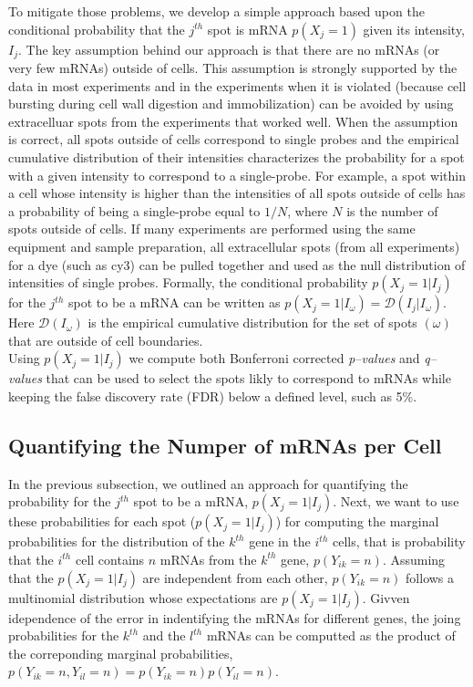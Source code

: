 \documentclass[10pt]{article}
\newcommand{\ith}{\ensuremath{i^{th} }\xspace	}
\newcommand{\jth}{\ensuremath{j^{th} }\xspace	}
\newcommand{\kth}{\ensuremath{k^{th} }\xspace	}
\newcommand{\lth}{\ensuremath{l^{th} }\xspace	}
\begin{document}
\begin{spacing}{1.5}
To mitigate those problems, we develop a simple approach based upon the conditional probability that the $j^{th}$ spot is mRNA $p(X_j=1)$ given its intensity, $I_j$. The key assumption behind our approach is that there are no mRNAs (or very few mRNAs) outside of cells. This assumption is strongly supported by the data in most experiments and in the experiments when it is violated (because cell bursting during cell wall digestion and immobilization) can be avoided by using extracelluar spots from the experiments that worked well. When the assumption is correct, all spots outside of cells correspond to single probes and the empirical cumulative distribution of their intensities characterizes the probability for a spot with a given intensity to correspond to a single-probe. For example, a spot within a cell whose intensity is higher than the intensities of all spots outside of cells has a probability of being a single-probe equal to $1/N$, where $N$ is the number of spots outside of cells. If many experiments are performed using the same equipment and sample preparation, all extracellular spots (from all experiments) for a dye (such as cy3) can be pulled together and used as the null distribution of intensities of single probes. Formally, the conditional probability $p(X_j=1|I_j)$ for  the $j^{th}$ spot to be a mRNA can be written as $p(X_j=1|I_{\omega}) = \mathcal D(I_j|I_{\omega})$. Here $\mathcal D(I_{\omega})$ is the empirical cumulative distribution for the set of spots $(\omega)$ that are outside of cell boundaries. \\

Using $p(X_j=1|I_j)$ we compute both Bonferroni corrected \emph{p--values} and \emph{q--values} that can be used to select the spots likly to correspond to mRNAs while keeping the false discovery rate (FDR) below a defined level, such as 5\%.   


\subsection*{Quantifying the Numper of mRNAs per Cell}
In the previous subsection, we outlined an approach for quantifying the probability for the \jth spot to be a mRNA, $p(X_j=1|I_j)$. Next, we want to use these probabilities for each spot ($p(X_j=1|I_j)$) for computing the marginal probabilities for the distribution of the \kth gene in the \ith cells, that is probability that the \ith cell contains $n$ mRNAs from the \kth gene, $p(Y_{ik}=n)$.  Assuming that the $p(X_j=1|I_j)$ are independent from each other,  $p(Y_{ik}=n)$ follows a multinomial distribution whose expectations are $p(X_j=1|I_j)$. Givven idependence of the error in indentifying the mRNAs for different genes, the joing probabilities for the \kth and the \lth mRNAs can be computted as the product of the correponding marginal probabilities,  $p(Y_{ik}=n, Y_{il}=n) = p(Y_{ik}=n) p(Y_{il}=n)$. 


\end{spacing}
\end{document}
